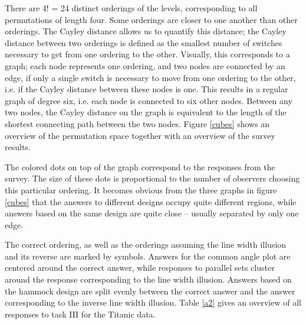\documentclass[journal]{vgtc}\usepackage{graphicx, color}
\begin{document}
There are 4! = 24 distinct orderings of the levels, corresponding to all permutations of length four. Some orderings are closer to one another than other orderings. 
The Cayley distance allows us to quantify this distance; the Cayley distance between two orderings is defined as the smallest number of switches necessary to get from one ordering to the other. Visually, this corresponds to a graph; each node represents one ordering, and two nodes are connected by an edge, if only a single switch is necessary to move from one ordering to the other, i.e. if the Cayley distance between these nodes is one.
This results  in a  regular graph of degree six, i.e. each  node is connected to six other nodes. Between any two nodes, the Cayley distance on the graph is equivalent to the length of the shortest connecting path between the two nodes.
Figure \ref{cubes} shows an overview of the permutation space together with an overview of the survey results. 

The colored dots on top of the graph correspond to the responses from the survey. The size of these dots is proportional to the number of observers choosing this particular ordering. It becomes obvious from the three graphs in figure \ref{cubes} that
the answers to different designs occupy quite different regions, while answers based  on the same design are quite close --  usually separated by only one edge. 

The correct ordering, as well as the orderings assuming the line width illusion and its reverse are marked by symbols. Answers for the common angle plot are centered around the correct answer, while responses to parallel sets  cluster around the response corresponding to the line width illusion. Answers based on the hammock design are split evenly between the correct answer and the answer corresponding to the  inverse line width illusion. Table \ref{a2} gives an overview of all responses to task III for the Titanic data.
\end{document}
